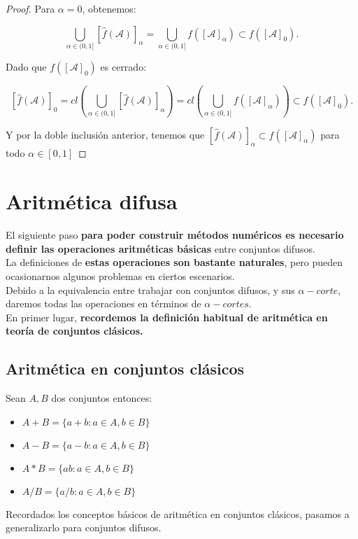 \begin{proof}
	Para $\alpha=0$, obtenemos:
	
	$$
	\bigcup_{\alpha \in (0, 1]} [\hat{f}(\mathcal{A})]_\alpha = \bigcup_{\alpha \in (0, 1]} f([\mathcal{A}]_\alpha) \subset f([\mathcal{A}]_0).
	$$
	
	Dado que $f([\mathcal{A}]_0)$ es cerrado:
	
	$$
	[\hat{f}(\mathcal{A})]_0 = cl\left( \bigcup_{\alpha \in (0, 1]} [\hat{f}(\mathcal{A})]_\alpha  \right) = cl\left(\bigcup_{\alpha \in (0, 1]} f([\mathcal{A}]_\alpha) \right)	\subset f([\mathcal{A}]_0).
	$$
	
	Y por la doble inclusión anterior, tenemos que $[\hat{f}(\mathcal{A})]_\alpha \subset f([\mathcal{A}]_\alpha)$ para todo $\alpha \in [0, 1]$
\end{proof}


\section{Aritmética difusa}
El siguiente paso \textbf{para poder construir métodos numéricos es necesario definir las operaciones aritméticas básicas} entre conjuntos difusos.\\
La definiciones de \textbf{estas operaciones son bastante naturales}, pero pueden ocasionarnos algunos problemas en ciertos escenarios.\\
Debido a la equivalencia entre trabajar con conjuntos difusos, y sus $\alpha-corte$, daremos todas las operaciones en términos de $\alpha-cortes$.\\
En primer lugar, \textbf{recordemos la definición habitual de aritmética en teoría de conjuntos clásicos.}

\subsection{Aritmética en conjuntos clásicos}
Sean $A, B$ dos conjuntos entonces:
\begin{itemize}
	\item $A+B=\{a+b : a \in A, b\in B\}$
	\item $A - B =\{a - b : a \in A, b\in B\}$
	\item $A * B =\{ab : a \in A, b\in B\}$
	\item $A / B =\{a/b : a \in A, b\in B\}$
\end{itemize}

Recordados los conceptos básicos de aritmética en conjuntos clásicos, pasamos a generalizarlo para conjuntos difusos.

